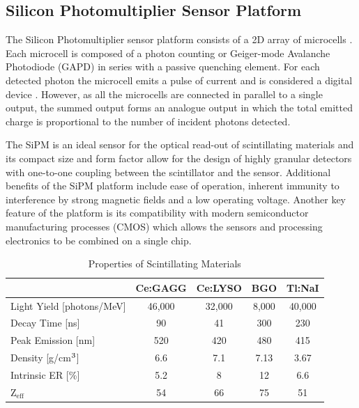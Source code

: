 \documentclass[journal]{IEEEtran}
\begin{document}
\subsection{Silicon Photomultiplier Sensor Platform}
The Silicon Photomultiplier sensor platform consists of a 2D array of microcells \cite{sipm:saveliev, sipm:stewart}. Each microcell is composed of a photon counting or Geiger-mode Avalanche Photodiode (GAPD) in series with a passive quenching element. For each detected photon the microcell emits a pulse of current and is considered a digital device \cite{stew02:stewart}. However, as all the microcells are connected in parallel to a single output, the summed output forms an analogue output in which the total emitted charge is proportional to the number of incident photons detected. 

The SiPM is an ideal sensor for the optical read-out of scintillating materials and its compact size and form factor allow for the design of highly granular detectors with one-to-one coupling between the scintillator and the sensor. Additional benefits of the SiPM platform include ease of operation, inherent immunity to interference by strong magnetic fields and a low operating voltage. Another key feature of the platform is its compatibility with modern semiconductor manufacturing processes (CMOS) which allows the sensors and processing electronics to be combined on a single chip. 

\begin{table}[bt]
\renewcommand{\arraystretch}{1.3}
\caption{Properties of Scintillating Materials}
\label{tab:scint_properties}
\centering
\begin{tabular}{l | c | c | c | c }
\hline
\bfseries  & \bfseries Ce:GAGG & \bfseries Ce:LYSO & \bfseries BGO & \bfseries Tl:NaI \\
\hline \hline
Light Yield [photons/MeV] & 46,000 & 32,000 & 8,000 & 40,000\\
Decay Time [ns] & 90 & 41 & 300 & 230\\
Peak Emission [nm] & 520 & 420 & 480 & 415\\
Density [g/cm$\textsuperscript{3}$] & 6.6 & 7.1 & 7.13 & 3.67\\
Intrinsic ER [\%] & 5.2 & 8 & 12 & 6.6\\
Z$_{\text{eff}}$  & 54 & 66 & 75 & 51\\
\hline
\end{tabular}
\end{table}
\end{document}
